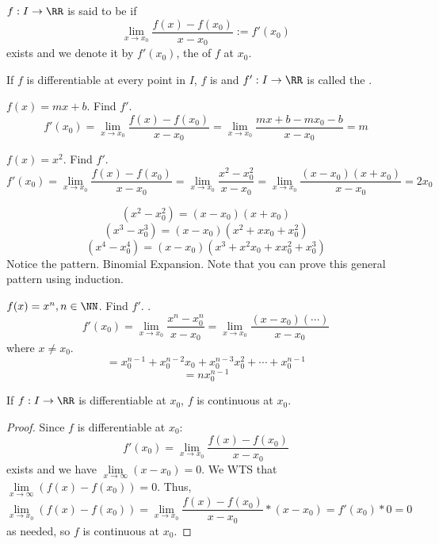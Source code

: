 \documentclass[12pt]{scrartcl}
\begin{document}
\begin{definition}
  $f: I \to \RR$ is said to be  if
  \[\underset{x\to x_0}{\lim}\frac{f(x) - f(x_0)}{x - x_0} := f'(x_0)\] exists 
  and we denote it by $f'(x_0)$, the  of $f$ at $x_0$.  
\end{definition}

\begin{remark}
  If $f$ is differentiable at every point in $I$, $f$ is  and 
  $f': I \to \RR$ is called the .
\end{remark}

\begin{example}
  $f(x) = mx + b$. Find $f'$.
  \[f'(x_0) = \lim_{x\to x_0}\frac{f(x) - f(x_0)}{x - x_0} = \lim_{x\to x_0}\frac{mx + b - mx_0 - b}{x - x_0} = m\]
\end{example}

\begin{example}
  $f(x) = x^2$. Find $f'$.
  \[f'(x_0) = \lim_{x\to x_0}\frac{f(x) - f(x_0)}{x - x_0} = \lim_{x\to x_0}\frac{x^2 - x_0^2}{x - x_0} = \lim_{x \to x_0} \frac{(x- x_0)(x+x_0)}{x-x_0} = 2x_0\]
\end{example}

\begin{note}
  \[(x^2 - x_0^2) = (x-x_0)(x+x_0)\]
  \[(x^3 - x_0^3) = (x-x_0)(x^2 + xx_0 + x_0^2)\]
  \[(x^4 - x_0^4) = (x-x_0)(x^3 + x^2x_0 + xx_0^2 + x_0^3)\]
  Notice the pattern. Binomial Expansion. Note that you can prove this general 
  pattern using induction.
\end{note}

\begin{example}
  $f(x) = x^n, n \in \NN$. Find $f'$. .
  \[f'(x_0) = \lim_{x\to x_0}\frac{x^n - x_0^n}{x - x_0} = \lim_{x\to x_0}\frac{(x-x_0)(\cdots)}{x - x_0}\]
  where $x \neq x_0$. 
  \[= x_0^{n-1} + x_0^{n-2}x_0 + x_0^{n-3}x_0^2 + \cdots + x_0^{n-1}\]
  \[= n x_0^{n-1}\]
\end{example}

\begin{theorem}
  If $f: I \to \RR$ is differentiable at $x_0$, $f$ is continuous at $x_0$.

  \begin{proof}
    Since $f$ is differentiable at $x_0$: 
    \[f'(x_0) = \lim_{x\to x_0} \frac{f(x) - f(x_0)}{x - x_0}\]
    exists and we have $\underset{x\to\infty}{\lim}(x-x_0) = 0$. We WTS that $\underset{x\to\infty}{\lim}(f(x) - f(x_0)) = 0$. 
    Thus, \[\underset{x\to x_0}{\lim}{(f(x) -  f(x_0))} = \lim_{x\to x_0}\frac{f(x) - f(x_0)}{x-x_0} * (x-x_0) = f'(x_0) * 0 = 0\]
    as needed, so $f$ is continuous at $x_0$.
  \end{proof}
\end{theorem}
\end{document}
